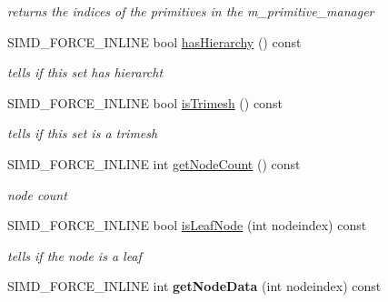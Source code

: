 \begin{DoxyCompactItemize}
\begin{DoxyCompactList}\small\item\em returns the indices of the primitives in the m\+\_\+primitive\+\_\+manager \end{DoxyCompactList}\item 
\mbox{\label{classbtGImpactBvh_a5844f79786deaa7ae7dc488b01783d43}} 
S\+I\+M\+D\+\_\+\+F\+O\+R\+C\+E\+\_\+\+I\+N\+L\+I\+NE bool \hyperlink{classbtGImpactBvh_a5844f79786deaa7ae7dc488b01783d43}{has\+Hierarchy} () const
\begin{DoxyCompactList}\small\item\em tells if this set has hierarcht \end{DoxyCompactList}\item 
\mbox{\label{classbtGImpactBvh_a774129b623660ef72355ee3bfb7795c2}} 
S\+I\+M\+D\+\_\+\+F\+O\+R\+C\+E\+\_\+\+I\+N\+L\+I\+NE bool \hyperlink{classbtGImpactBvh_a774129b623660ef72355ee3bfb7795c2}{is\+Trimesh} () const
\begin{DoxyCompactList}\small\item\em tells if this set is a trimesh \end{DoxyCompactList}\item 
\mbox{\label{classbtGImpactBvh_afd5814a39a896a636b74be929719311f}} 
S\+I\+M\+D\+\_\+\+F\+O\+R\+C\+E\+\_\+\+I\+N\+L\+I\+NE int \hyperlink{classbtGImpactBvh_afd5814a39a896a636b74be929719311f}{get\+Node\+Count} () const
\begin{DoxyCompactList}\small\item\em node count \end{DoxyCompactList}\item 
\mbox{\label{classbtGImpactBvh_a0f8180a21582bf93e89af78f4c446ad3}} 
S\+I\+M\+D\+\_\+\+F\+O\+R\+C\+E\+\_\+\+I\+N\+L\+I\+NE bool \hyperlink{classbtGImpactBvh_a0f8180a21582bf93e89af78f4c446ad3}{is\+Leaf\+Node} (int nodeindex) const
\begin{DoxyCompactList}\small\item\em tells if the node is a leaf \end{DoxyCompactList}\item 
\mbox{\label{classbtGImpactBvh_a59b86f8c3c63030847563367ce74b2c3}} 
S\+I\+M\+D\+\_\+\+F\+O\+R\+C\+E\+\_\+\+I\+N\+L\+I\+NE int {\bfseries get\+Node\+Data} (int nodeindex) const

\end{DoxyCompactItemize}
